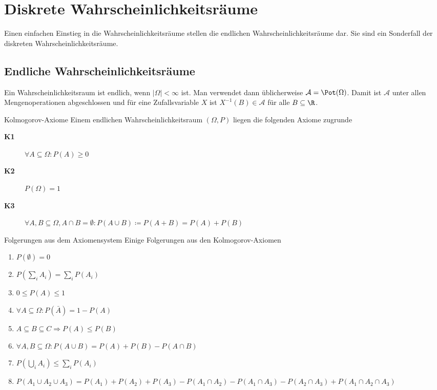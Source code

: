 \section{Diskrete Wahrscheinlichkeitsräume}
Einen einfachen Einstieg in die Wahrscheinlichkeitsräume stellen die endlichen Wahrscheinlichkeitsräume dar. Sie sind ein Sonderfall der diskreten Wahrscheinlichkeitsräume.
\subsection{Endliche Wahrscheinlichkeitsräume}
Ein Wahrscheinlichkeitsraum ist endlich, wenn $|\Omega|<\infty$ ist. Man verwendet dann üblicherweise $\mathcal A=\Pot(\Omega)$. Damit ist $\mathcal A$ unter allen Mengenoperationen abgeschlossen und für eine Zufallsvariable $X$ ist $X^{-1}(B)\in\mathcal A$ für alle $B\subseteq\R$.

\begin{definition}{Kolmogorov-Axiome}
	Einem endlichen Wahrscheinlichkeitsraum $(\Omega, P)$ liegen die folgenden Axiome zugrunde
	\begin{description}
		\item[\bf K1] $\forall A\subseteq \Omega: P(A)\geq 0$
		\item[\bf K2] $P(\Omega)=1$
		\item[\bf K3] $\forall A,B\subseteq \Omega, A\cap B=\emptyset: P(A\cup B)\coloneqq P(A+B)=P(A)+P(B) $
	\end{description}
\end{definition}

\begin{satz}{Folgerungen aus dem Axiomensystem}
	Einige Folgerungen aus den Kolmogorov-Axiomen
	\begin{enumerate}
		\item $P(\emptyset)=0$
		\item $P\left(\sum_i A_i\right)=\sum_i P(A_i)$
		\item $0\leq P(A)\leq 1$
		\item $\forall A\subseteq\Omega: P(\bar A)=1-P(A)$
		\item $A\subseteq B\subseteq C\Rightarrow P(A)\leq P(B)$
		\item $\forall A,B\subseteq \Omega: P(A\cup B)=P(A)+P(B)-P(A\cap B)$
		\item $P\left(\bigcup_i A_i\right)\leq \sum_i P(A_i)$
		\item $P(A_1\cup A_2\cup A_3)=P(A_1)+P(A_2)+P(A_3)-P(A_1\cap A_2)-P(A_1\cap A_3)-P(A_2\cap A_3)+P(A_1\cap A_2\cap A_3)$
	\end{enumerate}
\end{satz}

